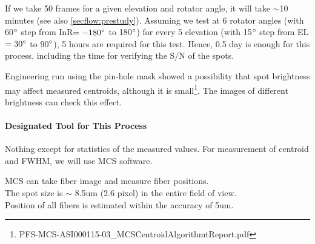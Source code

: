 If we take 50 frames for a given elevation and rotator angle, it will take $\sim$10 minutes (see also \ref{secflow:prestudy}).
Assuming we test at 6 rotator angles (with 60$^\circ$ step from InR$=-180^\circ$ to 180$^\circ$) for every 5 elevation (with 15$^\circ$ step from EL$=30^\circ$ to 90$^\circ$), 5 hours are required for this test.
Hence, 0.5 day is enough for this process, including the time for verifying the S/N of the spots.

Engineering run using the pin-hole mask showed a possibility that spot brightness may affect measured centroids, although it is small\footnote{PFS-MCS-ASI000115-03\_MCSCentroidAlgorithmtReport.pdf}.
The images of different brightness can check this effect.


\paragraph{Designated Tool for This Process}
Nothing except for statistics of the measured values.
For measurement of centroid and FWHM, we will use MCS software.


\begin{itembox}[l]{}
MCS can take fiber image and measure fiber positions. \\
The spot size is $\sim$ 8.5um (2.6 pixel) in the entire field of view. \\
Position of all fibers is estimated within the accuracy of 5um.

\end{itembox}